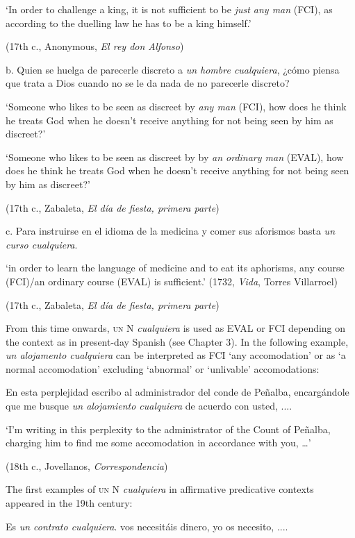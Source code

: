 ‘In order to challenge a king, it is not sufficient to be \textit{just any man} (FCI), as according to the duelling law he has to be a king himself.’

    (17th c., Anonymous, \textit{El rey don Alfonso})

  b.  Quien se huelga de parecerle discreto a \textit{un hombre cualquiera}, ¿cómo piensa que trata a Dios cuando no se le da nada de no parecerle discreto? 

    ‘Someone who likes to be seen as discreet by \textit{any man} (FCI), how does he think he treats God when he doesn’t receive anything for not being seen by him as discreet?’

    ‘Someone who likes to be seen as discreet by by \textit{an ordinary man} (EVAL), how does he think he treats God when he doesn’t receive anything for not being seen by him as discreet?’

    (17th c., Zabaleta, \textit{El día de fiesta, primera parte})

  c.  Para instruirse en el idioma de la medicina y comer sus aforismos basta \textit{un curso cualquiera}. 

    ‘in order to learn the language of medicine and to eat its aphorisms, any course (FCI)/an ordinary course (EVAL) is sufficient.’ (1732, \textit{Vida}, Torres Villarroel)

    (17th c., Zabaleta, \textit{El día de fiesta, primera parte})

From this time onwards, \textsc{un} N \textit{cualquiera} is used as EVAL or FCI depending on the context as in present-day Spanish (see Chapter 3). In the following example, \textit{un alojamento cualquiera} can be interpreted as FCI ‘any accomodation’ or as ‘a normal accomodation’ excluding ‘abnormal’ or ‘unlivable’ accomodations:

    En esta perplejidad escribo al administrador del conde de Peñalba, encargándole que me busque \textit{un alojamiento cualquiera} de acuerdo con usted, .... 

    ‘I’m writing in this perplexity to the administrator of the Count of Peñalba, charging him to find me some accomodation in accordance with you, …’

    (18th c., Jovellanos, \textit{Correspondencia})

The first examples of \textsc{un} N \textit{cualquiera} in affirmative predicative contexts appeared in the 19th century:

    Es \textit{un contrato cualquiera}. vos necesitáis dinero, yo os necesito, ....

